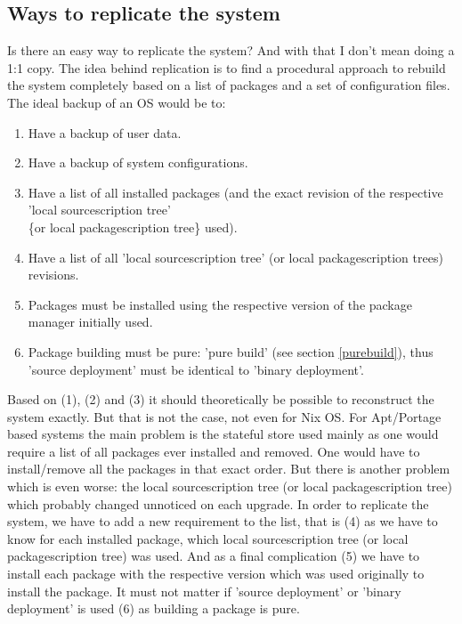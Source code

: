 \documentclass[a4paper,10pt]{article}
\begin{document}
\subsection{Ways to replicate the system}
\label{replicatethesystem}
Is there an easy way to replicate the system? And with that I don't mean doing a 1:1 copy. The idea behind replication is to find a procedural approach to rebuild the system completely based on a list of packages and a set of configuration files. The ideal backup of an OS would be to:
\begin{enumerate}
\item Have a backup of user data.
\item Have a backup of system configurations.
\item Have a list of all installed packages (and the exact revision of the respective 'local sourcescription tree'\\ \{or local packagescription tree\} used).
\item Have a list of all 'local sourcescription tree' (or local packagescription trees) revisions. 
\item Packages must be installed using the respective version of the package manager initially used.
\item Package building must be pure: 'pure build' (see section \ref{purebuild}), thus 'source deployment' must be identical to 'binary deployment'.
\end{enumerate}
Based on (1), (2) and (3) it should theoretically be possible to reconstruct the system exactly. But that is not the case, not even for Nix OS. For Apt/Portage based systems the main problem is the stateful store used mainly as one would require a list of all packages ever installed and removed. One would have to install/remove all the packages in that exact order. But there is another problem which is even worse: the local sourcescription tree (or local packagescription tree) which probably changed unnoticed on each upgrade. In order to replicate the system, we have to add a new requirement to the list, that is (4) as we have to know for each installed package, which local sourcescription tree (or local packagescription tree) was used. And as a final complication (5) we have to install each package with the respective version which was used originally to install the package. It must not matter if 'source deployment' or 'binary deployment' is used (6) as building a package is pure.
\end{document}
